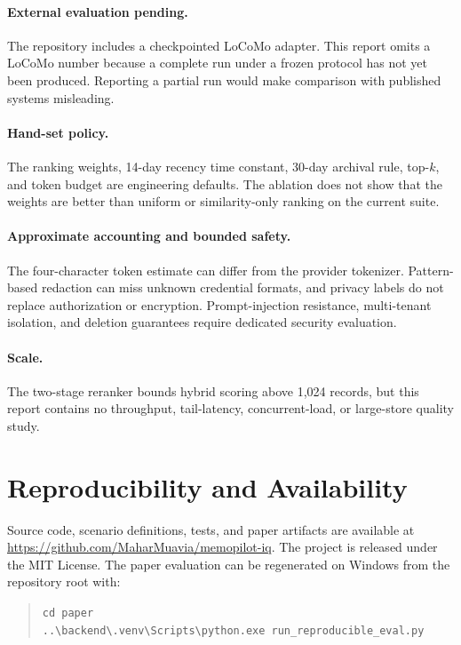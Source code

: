 \documentclass[11pt]{article}
\begin{document}
\paragraph{External evaluation pending.}
The repository includes a checkpointed LoCoMo adapter. This report omits a
LoCoMo number because a complete run under a frozen protocol has not yet been
produced. Reporting a partial run would make comparison with published systems
misleading.

\paragraph{Hand-set policy.}
The ranking weights, 14-day recency time constant, 30-day archival rule,
top-$k$, and token budget are engineering defaults. The ablation does not show
that the weights are better than uniform or similarity-only ranking on the
current suite.

\paragraph{Approximate accounting and bounded safety.}
The four-character token estimate can differ from the provider tokenizer.
Pattern-based redaction can miss unknown credential formats, and privacy labels
do not replace authorization or encryption. Prompt-injection resistance,
multi-tenant isolation, and deletion guarantees require dedicated security
evaluation.

\paragraph{Scale.}
The two-stage reranker bounds hybrid scoring above 1,024 records, but this
report contains no throughput, tail-latency, concurrent-load, or large-store
quality study.

\section{Reproducibility and Availability}
\label{sec:reproducibility}

Source code, scenario definitions, tests, and paper artifacts are available at
\url{https://github.com/MaharMuavia/memopilot-iq}. The project is released under
the MIT License. The paper evaluation can be regenerated on Windows from the
repository root with:

\begin{quote}
\texttt{cd paper}\\
\texttt{..\textbackslash backend\textbackslash .venv\textbackslash Scripts\textbackslash python.exe run\_reproducible\_eval.py}
\end{quote}
\end{document}
